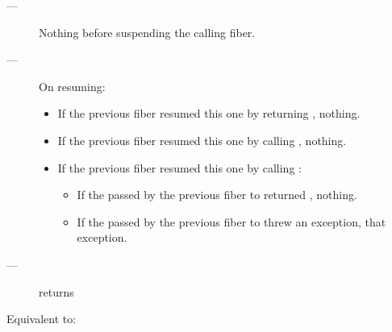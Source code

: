 \except
\begin{description}
    \item[---] Nothing before suspending the calling fiber.
    \item[---] On resuming:
    \begin{itemize}
        \item If the previous fiber resumed this one by returning \fiber,
              nothing.
        \item If the previous fiber resumed this one by calling \someresume,
              nothing.
        \item If the previous fiber resumed this one by calling \anyresumewith:
        \begin{itemize}
            \item If the  passed by the previous fiber
                  to \anyresumewith returned \fiber, nothing.
            \item If the  passed by the previous fiber
                  to \anyresumewith threw an exception, that exception.
        \end{itemize}
    \end{itemize}
\end{description}

\postcond
\begin{description}
    \item[---]  returns 
\end{description}




\effects
Equivalent to:\\


